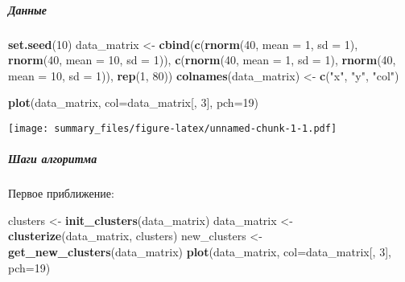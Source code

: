 \documentclass[
]{article}
\newenvironment{Shaded}{\begin{snugshade}}{\end{snugshade}}
\newcommand{\DataTypeTok}[1]{\textcolor[rgb]{0.13,0.29,0.53}{#1}}
\newcommand{\DecValTok}[1]{\textcolor[rgb]{0.00,0.00,0.81}{#1}}
\newcommand{\KeywordTok}[1]{\textcolor[rgb]{0.13,0.29,0.53}{\textbf{#1}}}
\newcommand{\NormalTok}[1]{#1}
\newcommand{\StringTok}[1]{\textcolor[rgb]{0.31,0.60,0.02}{#1}}
\begin{document}
\newpage

\hypertarget{ux434ux430ux43dux43dux44bux435}{%
\subparagraph{\texorpdfstring{\textbf{Данные}}{Данные}}\label{ux434ux430ux43dux43dux44bux435}}

\begin{Shaded}
\begin{Highlighting}[]
\KeywordTok{set.seed}\NormalTok{(}\DecValTok{10}\NormalTok{)}
\NormalTok{data_matrix <-}\StringTok{ }\KeywordTok{cbind}\NormalTok{(}\KeywordTok{c}\NormalTok{(}\KeywordTok{rnorm}\NormalTok{(}\DecValTok{40}\NormalTok{, }\DataTypeTok{mean =} \DecValTok{1}\NormalTok{, }\DataTypeTok{sd =} \DecValTok{1}\NormalTok{),}
                       \KeywordTok{rnorm}\NormalTok{(}\DecValTok{40}\NormalTok{, }\DataTypeTok{mean =} \DecValTok{10}\NormalTok{, }\DataTypeTok{sd =} \DecValTok{1}\NormalTok{)),}
                     \KeywordTok{c}\NormalTok{(}\KeywordTok{rnorm}\NormalTok{(}\DecValTok{40}\NormalTok{, }\DataTypeTok{mean =} \DecValTok{1}\NormalTok{, }\DataTypeTok{sd =} \DecValTok{1}\NormalTok{),}
                       \KeywordTok{rnorm}\NormalTok{(}\DecValTok{40}\NormalTok{, }\DataTypeTok{mean =} \DecValTok{10}\NormalTok{, }\DataTypeTok{sd =} \DecValTok{1}\NormalTok{)),}
                     \KeywordTok{rep}\NormalTok{(}\DecValTok{1}\NormalTok{, }\DecValTok{80}\NormalTok{))}
\KeywordTok{colnames}\NormalTok{(data_matrix) <-}\StringTok{ }\KeywordTok{c}\NormalTok{(}\StringTok{"x"}\NormalTok{, }\StringTok{"y"}\NormalTok{, }\StringTok{"col"}\NormalTok{)}

\KeywordTok{plot}\NormalTok{(data_matrix, }\DataTypeTok{col=}\NormalTok{data_matrix[, }\DecValTok{3}\NormalTok{], }\DataTypeTok{pch=}\DecValTok{19}\NormalTok{)}
\end{Highlighting}
\end{Shaded}

\texttt{[image: summary\_files/figure-latex/unnamed-chunk-1-1.pdf]}

\newpage

\hypertarget{ux448ux430ux433ux438-ux430ux43bux433ux43eux440ux438ux442ux43cux430}{%
\subparagraph{\texorpdfstring{\textbf{Шаги
алгоритма}}{Шаги алгоритма}}\label{ux448ux430ux433ux438-ux430ux43bux433ux43eux440ux438ux442ux43cux430}}

Первое приближение:

\begin{Shaded}
\begin{Highlighting}[]
\NormalTok{clusters <-}\StringTok{ }\KeywordTok{init_clusters}\NormalTok{(data_matrix)}
\NormalTok{data_matrix <-}\StringTok{ }\KeywordTok{clusterize}\NormalTok{(data_matrix, clusters)}
\NormalTok{new_clusters <-}\StringTok{ }\KeywordTok{get_new_clusters}\NormalTok{(data_matrix)}
\KeywordTok{plot}\NormalTok{(data_matrix, }\DataTypeTok{col=}\NormalTok{data_matrix[, }\DecValTok{3}\NormalTok{], }\DataTypeTok{pch=}\DecValTok{19}\NormalTok{)}
\end{Highlighting}
\end{Shaded}
\end{document}
